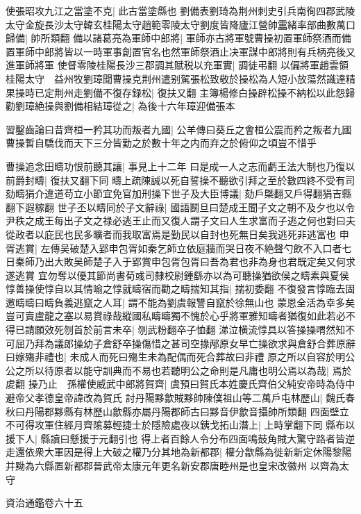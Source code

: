 使張昭攻九江之當塗不克|{
	此古當塗縣也}
劉備表劉琦為荆州刺史引兵南徇四郡武陵太守金旋長沙太守韓玄桂陽太守趙範零陵太守劉度皆降廬江營帥靁緒率部曲數萬口歸備|{
	帥所類翻}
備以諸葛亮為軍師中郎將|{
	軍師亦古將軍號曹操初置軍師祭酒而備置軍師中郎將皆以一時軍事創置官名也然軍師祭酒止决軍謀中郎將則有兵柄亮後又進軍師將軍}
使督零陵桂陽長沙三郡調其賦税以充軍實|{
	調徒弔翻}
以偏將軍趙雲領桂陽太守　益州牧劉璋聞曹操克荆州遣别駕張松致敬於操松為人短小放蕩然識達精果操時已定荆州走劉備不復存録松|{
	復扶又翻}
主簿楊修白操辟松操不納松以此怨歸勸劉璋絶操與劉備相結璋從之|{
	為後十六年璋迎備張本}


習鑿齒論曰昔齊桓一矜其功而叛者九國|{
	公羊傳曰葵丘之會桓公震而矜之叛者九國}
曹操暫自驕伐而天下三分皆勤之於數十年之内而弃之於俯仰之頃豈不惜乎

曹操追念田疇功恨前聽其讓|{
	事見上十二年}
曰是成一人之志而虧王法大制也乃復以前爵封疇|{
	復扶又翻下同}
疇上疏陳誠以死自誓操不聽欲引拜之至於數四終不受有司劾疇狷介違道苟立小節宜免官加刑操下世子及大臣博議|{
	劾戶槩翻又戶得翻狷吉縣翻下遐稼翻}
世子丕以疇同於子文辭祿|{
	國語鬭旦曰楚成王聞子文之朝不及夕也以令尹秩之成王每出子文之禄必逃王止而又復人謂子文曰人生求富而子逃之何也對曰夫從政者以庇民也民多曠者而我取富焉是勤民以自封也死無日矣我逃死非逃富也}
申胥逃賞|{
	左傳吴破楚入郢申包胥如秦乞師立依庭牆而哭日夜不絶聲勺飲不入口者七日秦師乃出大敗吴師楚子入于郢賞申包胥包胥曰吾為君也非為身也君既定矣又何求遂逃賞}
宜勿奪以優其節尚書荀彧司隸校尉鍾繇亦以為可聽操猶欲侯之疇素與夏侯惇善操使惇自以其情喻之惇就疇宿而勸之疇揣知其指|{
	揣初委翻}
不復發言惇臨去固邀疇疇曰疇負義逃竄之人耳|{
	謂不能為劉虞報讐自竄於徐無山也}
蒙恩全活為幸多矣豈可賣盧龍之塞以易賞祿哉縱國私疇疇獨不愧於心乎將軍雅知疇者猶復如此若必不得已請願效死刎首於前言未卒|{
	刎武粉翻卒子恤翻}
涕泣横流惇具以答操操喟然知不可屈乃拜為議郎操幼子倉舒卒操傷惜之甚司空掾邴原女早亡操欲求與倉舒合葬原辭曰嫁殤非禮也|{
	未成人而死曰殤生未為配偶而死合葬故曰非禮}
原之所以自容於明公公之所以待原者以能守訓典而不易也若聽明公之命則是凡庸也明公焉以為哉|{
	焉於䖍翻}
操乃止　孫權使威武中郎將賀齊|{
	虞預曰賀氏本姓慶氏齊伯父純安帝時為侍中避帝父孝德皇帝諱改為賀氏}
討丹陽黟歙賊黟帥陳僕祖山等二萬戶屯林歷山|{
	魏氏春秋曰丹陽郡黟縣有林歷山歙縣亦屬丹陽郡師古曰黟音伊歙音攝帥所類翻}
四面壁立不可得攻軍住經月齊隂募輕捷士於隱險處夜以銕戈拓山潛上|{
	上時掌翻下同}
縣布以援下人|{
	縣讀曰懸援于元翻引也}
得上者百餘人令分布四面鳴鼓角賊大驚守路者皆逆走還依衆大軍因是得上大破之權乃分其地為新都郡|{
	權分歙縣為徙新新定休陽黎陽并黝為六縣置新都郡晉武帝太康元年更名新安郡唐睦州是也皇宋改徽州}
以齊為太守

資治通鑑卷六十五
